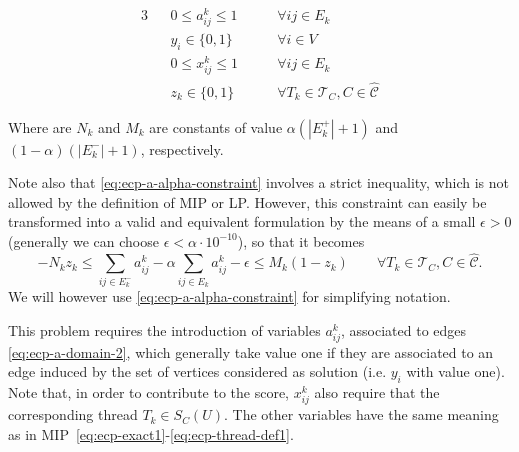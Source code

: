 \begin{alignat}{3}
	\label{eq:ecp-a-domain-2}
	                                                                 &                    & 0 \leq
	a_{ij}^{k} \leq 1  \quad\quad                                    & \forall ij \in E_k                                                                                                                                                        \\
	\label{eq:ecp-vertex-def2}
	                                                                 &                    & y _{i}                                                             \in  \{0, 1\} \quad\quad              & \forall i \in V                           \\
	\label{eq:ecp-edge-def2}
	                                                                 &                    & 0 \leq x _{ij} ^{k}                                                \leq 1 \quad\quad                     & \forall ij \in E_k                        \\
	\label{eq:ecp-z-domain-2}
	                                                                 &                    & z _{k}                                                             \in  \{0, 1\} \quad\quad              & \forall T_{k} \in \mathcal{T} _{C}, C \in
	\hat{\mathcal{C}}
\end{alignat}

Where are $N_k$ and $M_k$ are constants of value $\alpha (|E_k^{+}| + 1)$ and $(1 -
	\alpha ) (|E^{-}_k| + 1)$, respectively.

Note also that \eqref{eq:ecp-a-alpha-constraint} involves a strict inequality,
which is not allowed by the definition of
\acrshort{MIP} or \acrshort{LP}. However, this constraint can easily be
transformed into a valid
and equivalent formulation by the means of a small $\epsilon > 0$ (generally
we can choose $\epsilon < \alpha \cdot 10^{-10}$), so that
it becomes
\begin{equation*}
	-N_k z_k \leq \sum^{}_{ij \in E^-_k} a_{ij}^{k}  - \alpha \sum^{}_{ij
		\in E_k}
	a_{ij} ^{k} - \epsilon \leq M_{k} (1 - z_{k})  \quad\quad \forall T_{k} \in
	\mathcal{T} _{C}, C \in \mathcal{\hat{C}}.
\end{equation*}
We will however use \eqref{eq:ecp-a-alpha-constraint} for simplifying notation.

This problem requires the introduction of variables $a_{ij}^{k}$,
associated to edges \eqref{eq:ecp-a-domain-2}, which
generally take value one if they are associated to an edge induced by the
set of vertices considered as solution (i.e. $y_i$ with value one). Note that,
in order to contribute to the score, $x_{ij}^{k}$ also require that the
corresponding thread $T_k \in S_C(U)$. The
other variables have the same meaning as in MIP~\eqref{eq:ecp-exact1}-\eqref{eq:ecp-thread-def1}.

